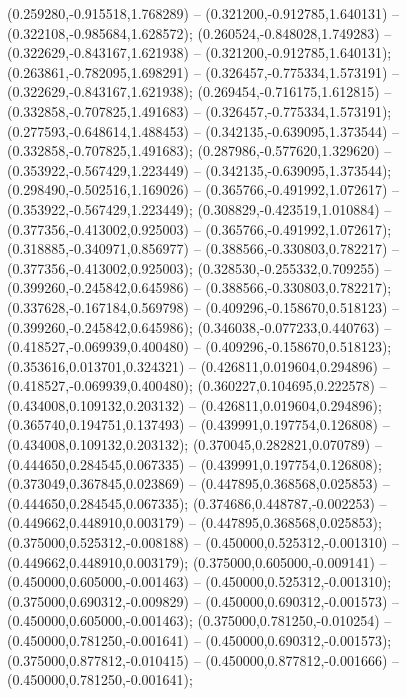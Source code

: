  (0.259280,-0.915518,1.768289) -- (0.321200,-0.912785,1.640131) -- (0.322108,-0.985684,1.628572);
 (0.260524,-0.848028,1.749283) -- (0.322629,-0.843167,1.621938) -- (0.321200,-0.912785,1.640131);
 (0.263861,-0.782095,1.698291) -- (0.326457,-0.775334,1.573191) -- (0.322629,-0.843167,1.621938);
 (0.269454,-0.716175,1.612815) -- (0.332858,-0.707825,1.491683) -- (0.326457,-0.775334,1.573191);
 (0.277593,-0.648614,1.488453) -- (0.342135,-0.639095,1.373544) -- (0.332858,-0.707825,1.491683);
 (0.287986,-0.577620,1.329620) -- (0.353922,-0.567429,1.223449) -- (0.342135,-0.639095,1.373544);
 (0.298490,-0.502516,1.169026) -- (0.365766,-0.491992,1.072617) -- (0.353922,-0.567429,1.223449);
 (0.308829,-0.423519,1.010884) -- (0.377356,-0.413002,0.925003) -- (0.365766,-0.491992,1.072617);
 (0.318885,-0.340971,0.856977) -- (0.388566,-0.330803,0.782217) -- (0.377356,-0.413002,0.925003);
 (0.328530,-0.255332,0.709255) -- (0.399260,-0.245842,0.645986) -- (0.388566,-0.330803,0.782217);
 (0.337628,-0.167184,0.569798) -- (0.409296,-0.158670,0.518123) -- (0.399260,-0.245842,0.645986);
 (0.346038,-0.077233,0.440763) -- (0.418527,-0.069939,0.400480) -- (0.409296,-0.158670,0.518123);
 (0.353616,0.013701,0.324321) -- (0.426811,0.019604,0.294896) -- (0.418527,-0.069939,0.400480);
 (0.360227,0.104695,0.222578) -- (0.434008,0.109132,0.203132) -- (0.426811,0.019604,0.294896);
 (0.365740,0.194751,0.137493) -- (0.439991,0.197754,0.126808) -- (0.434008,0.109132,0.203132);
 (0.370045,0.282821,0.070789) -- (0.444650,0.284545,0.067335) -- (0.439991,0.197754,0.126808);
 (0.373049,0.367845,0.023869) -- (0.447895,0.368568,0.025853) -- (0.444650,0.284545,0.067335);
 (0.374686,0.448787,-0.002253) -- (0.449662,0.448910,0.003179) -- (0.447895,0.368568,0.025853);
 (0.375000,0.525312,-0.008188) -- (0.450000,0.525312,-0.001310) -- (0.449662,0.448910,0.003179);
 (0.375000,0.605000,-0.009141) -- (0.450000,0.605000,-0.001463) -- (0.450000,0.525312,-0.001310);
 (0.375000,0.690312,-0.009829) -- (0.450000,0.690312,-0.001573) -- (0.450000,0.605000,-0.001463);
 (0.375000,0.781250,-0.010254) -- (0.450000,0.781250,-0.001641) -- (0.450000,0.690312,-0.001573);
 (0.375000,0.877812,-0.010415) -- (0.450000,0.877812,-0.001666) -- (0.450000,0.781250,-0.001641);
